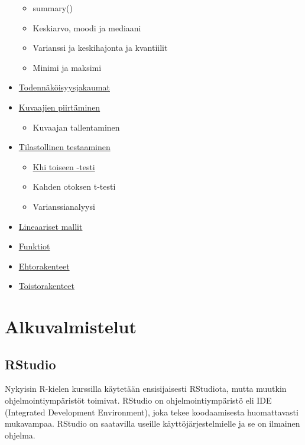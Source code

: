 \documentclass[
]{book}
\providecommand{\tightlist}{%
  \setlength{\itemsep}{0pt}\setlength{\parskip}{0pt}}
\begin{document}
\begin{itemize}
  \begin{itemize}
  \tightlist
  \item
    summary()
  \item
    Keskiarvo, moodi ja mediaani
  \item
    Varianssi ja keskihajonta ja kvantiilit
  \item
    Minimi ja maksimi
  \end{itemize}
\item
  \protect\hyperlink{distributions}{Todennäköisyysjakaumat}
\item
  \protect\hyperlink{plotting}{Kuvaajien piirtäminen}

  \begin{itemize}
  \tightlist
  \item
    Kuvaajan tallentaminen
  \end{itemize}
\item
  \protect\hyperlink{tests}{Tilastollinen testaaminen}

  \begin{itemize}
  \tightlist
  \item
    \protect\hyperlink{chi-squared-test}{Khi toiseen -testi}
  \item
    Kahden otoksen t-testi
  \item
    Varianssianalyysi
  \end{itemize}
\item
  \protect\hyperlink{linear_models}{Lineaariset mallit}
\item
  \protect\hyperlink{functions}{Funktiot}
\item
  \protect\hyperlink{ifelse}{Ehtorakenteet}
\item
  \protect\hyperlink{loops}{Toistorakenteet}
\end{itemize}

\hypertarget{alkuvalmistelut}{%
\chapter*{Alkuvalmistelut}\label{alkuvalmistelut}}

\hypertarget{rstudio}{%
\section*{RStudio}\label{rstudio}}

Nykyisin R-kielen kurssilla käytetään ensisijaisesti RStudiota, mutta muutkin ohjelmointiympäristöt toimivat. RStudio on ohjelmointiympäristö eli IDE (Integrated Development Environment), joka tekee koodaamisesta huomattavasti mukavampaa. RStudio on saatavilla useille käyttöjärjestelmielle ja se on ilmainen ohjelma.
\end{document}
